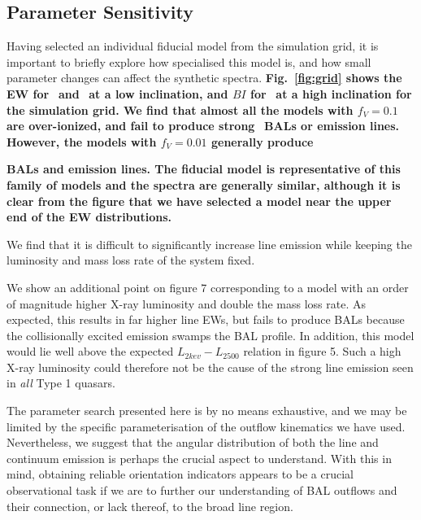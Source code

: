\documentclass[useAMS,usenatbib]{mn2e_x}
\begin{document}
\subsection{Parameter Sensitivity}

\label{sec:param_sens}

Having selected an individual fiducial model from the simulation grid, it is important
to briefly explore how specialised this model is, and how small parameter
changes can affect the synthetic spectra. {\bf Fig.~\ref{fig:grid}
shows the EW for} \civline\ {\bf and} \mgline\ {\bf at a low inclination, 
and $BI$ for} \civline\ {\bf at a high inclination for the simulation
grid. We find that almost all the models with $f_V=0.1$ are over-ionized, and 
fail to produce strong} \civ\ {\bf BALs or emission lines. However, 
the models with $f_V=0.01$ generally produce} \civ\ {\bf BALs and emission lines.
The fiducial model is representative of this family of models and 
the spectra are generally similar, although it is clear from the figure
that we have selected a model near the upper end of the EW distributions.

We find that it is difficult to significantly increase line emission while
keeping the luminosity and mass loss rate of the system fixed.}
We show an additional point on figure 7 corresponding to a model with an order of
magnitude higher X-ray luminosity and double the mass loss rate. As expected, 
this results in far higher line EWs, but fails to produce BALs because
the collisionally excited emission swamps the BAL profile. In addition,
this model would lie well above the expected $L_{2kev}-L_{2500}$ 
relation in figure 5. Such a high X-ray luminosity could therefore 
not be the cause of the strong line emission seen in {\em all} Type 1 quasars.

The parameter search presented here is by no means exhaustive, and
we may be limited by the specific parameterisation of the outflow 
kinematics we have used. Nevertheless, we suggest that the angular distribution
of both the line and continuum emission is perhaps the crucial 
aspect to understand. With this in mind, obtaining reliable orientation 
indicators appears to be a crucial observational task if we are to
further our understanding of BAL outflows 
and their connection, or lack thereof, to the 
broad line region. 



\end{document}
